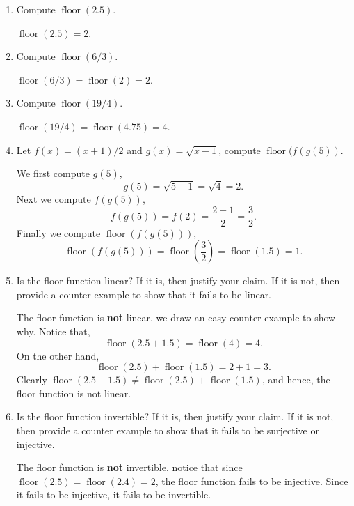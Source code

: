 \documentclass[12pt]{article} %
\begin{document}
\begin{enumerate}[label=(\alph*)]
  \item Compute $ \operatorname{floor}(2.5)$.
    \begin{solution}
      $ \operatorname{floor}(2.5) = 2$.
    \end{solution}
  \item Compute $ \operatorname{floor}(6 / 3)$.
    \begin{solution}
      $ \operatorname{floor}(6 / 3) = \operatorname{floor}(2) = 2$.
    \end{solution}
  \item Compute $ \operatorname{floor}(19 / 4)$.
    \begin{solution}
      $ \operatorname{floor}(19 / 4) = \operatorname{floor}(4.75) = 4$.
    \end{solution}
  \item Let $f(x) = (x + 1) / 2$ and $g(x) = \sqrt{x - 1}$, compute $ \operatorname{floor}(f(g(5))$.
    \begin{solution}
      We first compute $g(5)$,
      \[
          g(5) = \sqrt{5-  1} = \sqrt{4}  = 2
      .\] Next we compute $f(g(5))$,
      \[
          f(g(5)) = f(2) = \frac{2 + 1}{2} = \frac{3}{2}
      .\] Finally we compute $ \operatorname{floor}(f(g(5)))$,
      \[
          \operatorname{floor}(f(g(5))) = \operatorname{floor}\left( \frac{3}{2} \right) =
          \operatorname{floor}(1.5) = 1
      .\] 
    \end{solution}
  \item Is the floor function linear? If it is, then justify your claim. If it is not, then provide a counter example to
        show that it fails to be linear.
        \begin{solution}
          The floor function is \textbf{not} linear, we draw an easy counter example to show why. Notice that,
          \[
              \operatorname{floor}(2.5 + 1.5) = \operatorname{floor}(4) = 4
          .\] On the other hand,
          \[
              \operatorname{floor}(2.5) + \operatorname{floor}(1.5) = 2 + 1 = 3
          .\] Clearly $ \operatorname{floor}(2.5 + 1.5) \neq \operatorname{floor}(2.5) +
          \operatorname{floor}(1.5)$, and hence, the floor function is not linear.
        \end{solution}
  \item Is the floor function invertible? If it is, then justify your claim. If it is not, then provide a counter example to
        show that it fails to be surjective or injective. 
        \begin{solution}
          The floor function is \textbf{not} invertible, notice that since $ \operatorname{floor}(2.5) =
          \operatorname{floor}(2.4) = 2$, the floor function fails to be injective. Since it fails to be injective,
        it fails to be invertible.
        \end{solution}
\end{enumerate}
\end{document}
